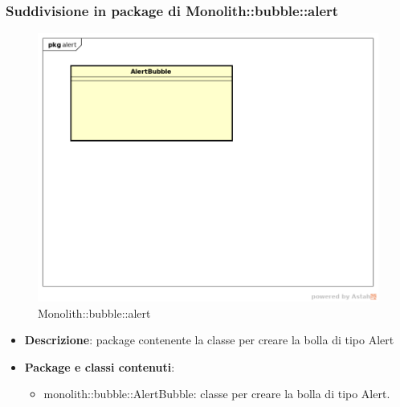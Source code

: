 	\subsubsection{Suddivisione in package  di Monolith::bubble::alert}
\label{Monolith::bubble::alert}
\begin{figure}[H]
	\centering
	\includegraphics[scale=0.5]{Sezioni/imgPackage/bubble_alert.png}
	\caption{Monolith::bubble::alert}
\end{figure}
\begin{itemize}
	\item{\textbf{Descrizione}}: package contenente la classe per creare la bolla di tipo Alert
	\item{\textbf{Package e classi contenuti}}:
	\begin{itemize}
	\item{monolith::bubble::AlertBubble}: classe per creare la bolla di tipo Alert.
	\end{itemize}
\end{itemize}



